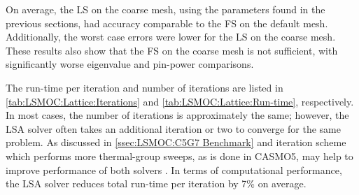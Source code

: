 {{{      On average, the \ac{LS} on the coarse mesh, using the parameters found in the previous sections, had accuracy comparable to the \ac{FS} on the default mesh.
      Additionally, the worst case errors were lower for the \ac{LS} on the coarse mesh.
      These results also show that the \ac{FS} on the coarse mesh is not sufficient, with significantly worse eigenvalue and pin-power comparisons.

      The run-time per iteration and number of iterations are listed in \cref{tab:LSMOC:Lattice:Iterations} and \cref{tab:LSMOC:Lattice:Run-time}, respectively.
      In most cases, the number of iterations is approximately the same; however, the \ac{LSA} solver often takes an additional iteration or two to converge for the same problem.
      As discussed in \cref{ssec:LSMOC:C5G7 Benchmark} and iteration scheme which performs more thermal-group sweeps, as is done in CASMO5, may help to improve performance of both solvers \cite{FerrerPersoanlCommunications2018}.
      In terms of computational performance, the \ac{LSA} solver reduces total run-time per iteration by 7\% on average.

}}}
